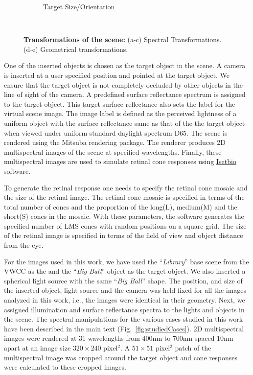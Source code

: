 \documentclass{jov}
\begin{document}
\begin{figure}
\begin{subfigure}[b]{0.18 \textwidth}
        \caption{Target Size/Orientation}
        \label{fig:targetSizeOrientation}
    \end{subfigure}
    ~ %
    \caption{{\bf Transformations of the scene:} (a-c) Spectral Transformations. (d-e) Geometrical transformations.}\label{fig:spectralTransformations}
\end{figure}

One of the inserted objects is chosen as the target object in the scene. A camera is inserted at a user specified position and pointed at the target object. We ensure that the target object is not completely occluded by other objects in the line of sight of the camera. A predefined surface reflectance spectrum is assigned to the target object. This target surface reflectance also sets the label for the virtual scene image. The image label is defined as the perceived lightness of a uniform object with the surface reflectance same as that of the the target object when viewed under uniform standard daylight spectrum D65. The scene is rendered using the Mitsuba rendering package. The renderer produces 2D multispectral images of the scene at specified wavelengths. Finally, these multispectral images are used to simulate retinal cone responses using \href{https://github.com/isetbio}{Isetbio} software.

To generate the retinal response one needs to specify the retinal cone mosaic and the size of the retinal image. The retinal cone mosaic is specified in terms of the total number of cones and the proportion of the long(L), medium(M) and the short(S) cones in the mosaic. With these parameters, the software generates the specified number of LMS cones with random positions on a square grid. The size of the retinal image is specified in terms of the field of view and object distance from the eye. 

For the images used in this work, we have used the ``{\it Library}'' base scene from the VWCC  as the and the ``{\it Big Ball}'' object as the target object. We also inserted a spherical light source with the same ``{\it Big Ball}'' shape. The position, and size of the inserted object, light source and the camera was held fixed for all the images analyzed in this work, i.e., the images were identical in their geometry. Next, we assigned illumination and surface reflectance spectra to the lights and objects in the scene. The spectral manipulations for the various cases studied in this work have been described in the main text (Fig.~\ref{fig:studiedCases}). 2D multispectral images were rendered at 31 wavelengths from $400$nm to $700$nm spaced $10$nm apart at an image size $320\times 240$ pixel$^2$. A $51 \times 51$ pixel$^2$ patch of the multispectral image was cropped around the target object and cone responses were calculated to these cropped images.
\end{document}
